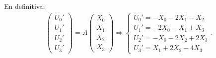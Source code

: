 \documentclass[10pt,a4paper,openright]{book}
\theoremstyle{break}
\begin{document}
En definitiva:
\begin{align*}
\begin{pmatrix} U_0'\\ U_1'\\ U_2'\\ U_3' \end{pmatrix} = A \begin{pmatrix} X_0\\ X_1\\ X_2\\ X_3 \end{pmatrix} \Rightarrow
\begin{cases}
    U_0' = -X_0 - 2X_1 - X_2\\
    U_1' = -2X_0 - X_1 + X_3\\
    U_2' = -X_0 - 2X_2 + 2X_3\\
    U_3' = X_1 + 2X_2 - 4X_3
\end{cases} 
.\end{align*}
\end{document}
